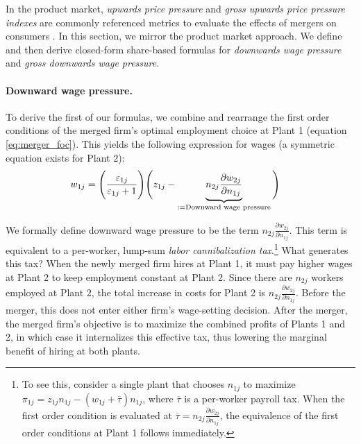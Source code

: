 \documentclass[12pt]{article}
\theoremstyle{prop}
\begin{document}
In the product market,   \textit{upwards price pressure} and \textit{gross upwards price pressure indexes} are commonly referenced metrics to evaluate the effects of mergers on consumers \citep[e.g.][]{farrell2010antitrust,naidu2018antitrust}. 
In this section, we mirror the product market approach. 
We define and then derive closed-form share-based formulas for \textit{downwards wage pressure} and \textit{gross downwards wage pressure}.
 
\paragraph{Downward wage pressure.} 
To derive the first of our formulas, we combine and rearrange the first order conditions of the merged firm's optimal employment choice at Plant 1 (equation \ref{eq:merger_foc}). 
This yields the following expression for wages (a symmetric equation exists for Plant 2):
{\vspace{-.2cm}\begin{align}
	\label{eq:diversion_dwp}
	w_{1j} & = \Bigg(\frac{\varepsilon_{1j}}{\varepsilon_{1j} + 1}\Bigg) \Bigg( z_{1j} - \underbrace{n_{2j} \frac{\partial w_{2j}}{\partial n_{1j}}}_{:=\text{Downward wage pressure}}\Bigg)
\vspace{-.2cm}\end{align}}

We formally define downward wage pressure to be the term $n_{2j} \frac{\partial w_{2j}}{\partial n_{1j}}$. 
This term is equivalent to a per-worker,  lump-sum \emph{labor cannibalization tax}.\footnote{
    To see this, consider a single plant that chooses $n_{1j}$ to maximize 
    $\pi_{1j} = z_{1j} n_{1j} - (w_{1j}+\overline{\tau})n_{1j}$,
    where $\overline{\tau}$ is a per-worker payroll tax. 
    When the first order condition is evaluated at $\overline{\tau}=n_{2j} \frac{\partial w_{2j}}{\partial n_{1j}}$, the equivalence of the first order conditions at Plant 1 follows immediately.} 
What generates this tax?
When the newly merged firm hires at Plant 1, it must pay higher wages at Plant 2 to keep employment constant at Plant 2. 
Since there are $n_{2j}$ workers employed at Plant 2, the total increase in costs for Plant 2 is $n_{2j} \frac{\partial w_{2j}}{\partial n_{1j}}$. 
Before the merger, this does not enter either firm's wage-setting decision. 
After the merger, the merged firm's objective is to maximize the combined profits of Plants 1 and 2, in which case it internalizes this effective tax, thus lowering the marginal benefit of hiring at both plants.
\end{document}
